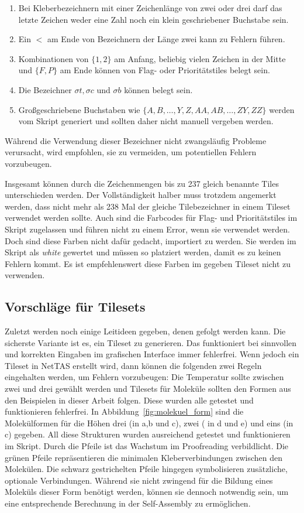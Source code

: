 \begin{enumerate}
\item Bei Kleberbezeichnern mit einer Zeichenlänge von zwei oder drei darf das letzte Zeichen weder eine Zahl noch ein klein geschriebener Buchstabe sein.
\item Ein $<$ am Ende von Bezeichnern der Länge zwei kann zu Fehlern führen.
\item Kombinationen von $\{1,2\}$ am Anfang, beliebig vielen Zeichen in der Mitte und $\{F,P\}$ am Ende können von Flag- oder Prioritätstiles belegt sein.
\item Die Bezeichner $\sigma t, \sigma c$ und $\sigma b$ können belegt sein.
\item Großgeschriebene Buchstaben wie $\{A,B,\dots,Y,Z,AA,AB,\dots,ZY,ZZ\}$ werden vom Skript generiert und sollten daher nicht manuell vergeben werden.
\end{enumerate}

Während die Verwendung dieser Bezeichner nicht zwangsläufig Probleme verursacht, wird empfohlen, sie zu vermeiden, um potentiellen Fehlern vorzubeugen.

Insgesamt können durch die Zeichenmengen bis zu 237 gleich benannte Tiles unterschieden werden. Der Vollständigkeit halber muss trotzdem angemerkt werden, dass nicht mehr als 238 Mal der gleiche Tilebezeichner in einem Tileset verwendet werden sollte. 
Auch sind die Farbcodes für Flag- und Prioritätstiles im Skript zugelassen und führen nicht zu einem Error, wenn sie verwendet werden. Doch sind diese Farben nicht dafür gedacht, importiert zu werden. Sie werden im Skript als \emph{white} gewertet und müssen so platziert werden, damit es zu keinen Fehlern kommt. Es ist empfehlenswert diese Farben im gegeben Tileset nicht zu verwenden.

\subsection{Vorschläge für Tilesets}

Zuletzt werden noch einige Leitideen gegeben, denen gefolgt werden kann. Die sicherste Variante ist es, ein Tileset zu generieren. Das funktioniert bei sinnvollen und korrekten Eingaben im grafischen Interface immer fehlerfrei. Wenn jedoch ein Tileset in NetTAS erstellt wird, dann können die folgenden zwei Regeln eingehalten werden, um Fehlern vorzubeugen: Die Temperatur sollte zwischen zwei und drei gewählt werden und Tilesets für Moleküle sollten den Formen aus den Beispielen in dieser Arbeit folgen. Diese wurden alle getestet und funktionieren fehlerfrei. In Abbildung~\ref{fig:molekuel_form} sind die Molekülformen für die Höhen drei (in a,b und c), zwei ( in d und e)  und eins (in c) gegeben. All diese Strukturen wurden ausreichend getestet und funktionieren im Skript. Durch die Pfeile ist das Wachstum im Proofreading verbildlicht. Die grünen Pfeile repräsentieren die minimalen Kleberverbindungen zwischen den Molekülen. Die schwarz gestrichelten Pfeile hingegen symbolisieren zusätzliche, optionale Verbindungen. Während sie nicht zwingend für die Bildung eines Moleküls dieser Form benötigt werden, können sie dennoch notwendig sein, um eine entsprechende Berechnung in der Self-Assembly zu ermöglichen.

